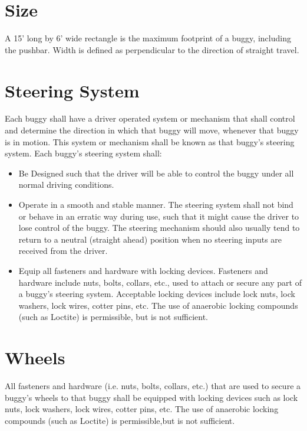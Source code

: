 \section{Size}

	A 15' long by 6' wide rectangle is the maximum footprint of a buggy, including 
	the pushbar. Width is defined as perpendicular to the direction of straight travel.

\section{Steering System}

	Each buggy shall have a driver operated system or mechanism that shall control
	and determine the direction in which that buggy will move, whenever that buggy
	is in motion. This system or mechanism shall be known as that buggy's steering
	system. Each buggy's steering system shall:

	\begin{itemize}

		\item
		Be Designed such that the driver will be able to
		control the buggy under all normal driving conditions.

		\item
		Operate in a smooth and stable manner. The steering
		system shall not bind or behave in an erratic way during use, such that it
		might cause the driver to lose control of the buggy. The steering mechanism 
		should also usually tend to	return to a neutral (straight ahead) position 
		when no steering inputs are	received from the driver.

		\item
		Equip all fasteners and hardware with locking devices. Fasteners and hardware 
		include nuts, bolts, collars, etc., used to attach or secure any part of a buggy's 
		steering system. Acceptable locking devices include lock nuts, lock washers, lock 
		wires, cotter pins, etc. The use of anaerobic locking compounds (such as Loctite) 
		is permissible, but is not 	sufficient.

	\end{itemize}

\section{Wheels}

	All fasteners and hardware (i.e. nuts, bolts, collars, etc.) that are used to
	secure a buggy's wheels to that buggy shall be equipped with locking devices
	such as lock nuts, lock washers, lock wires, cotter pins, etc. The use of
	anaerobic locking compounds (such as Loctite) is permissible,but is not
	sufficient.

